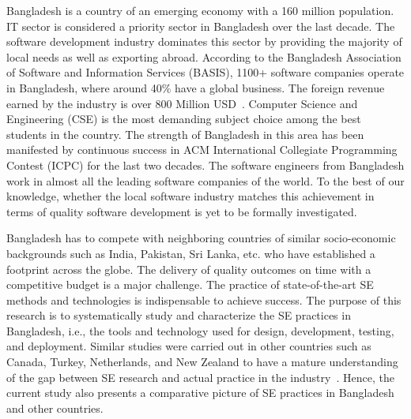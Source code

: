 Bangladesh is a country of an emerging economy with a 160 million population. IT sector is considered a priority sector in Bangladesh over the last decade. The software development industry dominates this sector by providing the majority of local needs as well as exporting abroad. According to the Bangladesh Association of Software and Information Services (BASIS), 1100+ software companies operate in Bangladesh, where around 40\% have a global business. The foreign revenue earned by the industry is over 800 Million USD~\cite{BASIS2018}. Computer Science and Engineering (CSE) is the most demanding subject choice among the best students in the country. The strength of Bangladesh in this area has been manifested by continuous success in ACM International Collegiate Programming Contest (ICPC) for the last two decades. The software engineers from Bangladesh work in almost all the leading software companies of the world. To the best of our knowledge, whether the local software industry matches this achievement in terms of quality software development is yet to be formally investigated.

Bangladesh has to compete with neighboring countries of similar socio-economic backgrounds such as India, Pakistan, Sri Lanka, etc. who have established a footprint across the globe. The delivery of quality outcomes on time with a competitive budget is a major challenge. The practice of state-of-the-art SE methods and technologies is indispensable to achieve success. The purpose of this research is to systematically study and characterize the SE practices in Bangladesh, i.e., the tools and technology used for design, development, testing, and deployment. Similar studies were carried out in other countries such as Canada, Turkey, Netherlands, and New Zealand to have a mature understanding of the gap between SE research and actual practice in the industry~\cite{Garousi2013, Garousi2015, Vonken2012, Wang2018}. Hence, the current study also presents a comparative picture of SE practices in Bangladesh and other countries. 

